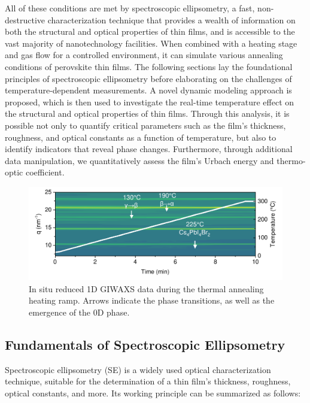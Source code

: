 All of these conditions are met by spectroscopic ellipsometry, a fast, non-destructive characterization technique that provides a wealth of information on both the structural and optical properties of thin films, and is accessible to the vast majority of nanotechnology facilities. When combined with a heating stage and gas flow for a controlled environment, it can simulate various annealing conditions of perovskite thin films. The following sections lay the foundational principles of spectroscopic ellipsometry before elaborating on the challenges of temperature-dependent measurements. A novel dynamic modeling approach is proposed, which is then used to investigate the real-time temperature effect on the structural and optical properties of  thin films. Through this analysis, it is possible not only to quantify critical parameters such as the film's thickness, roughness, and optical constants as a function of temperature, but also to identify indicators that reveal phase changes. Furthermore, through additional data manipulation, we quantitatively assess the film's Urbach energy and thermo-optic coefficient.


\begin{figure}
  \centering
  \medskip
  \includegraphics[width=\textwidth]{chapters/material_properties/images/GIWAXS_In_Situ.pdf}
  \caption[Short caption for Table of Figures]{In situ reduced 1D GIWAXS data during the thermal annealing heating ramp. Arrows indicate the phase transitions, as well as the emergence of the 0D  phase.} 
  
  \label{fig:ch2:giwaxs_insitu}
\end{figure}



\subsection{Fundamentals of Spectroscopic Ellipsometry} \label{ch:ellipsometry:intro}


Spectroscopic ellipsometry (SE) is a widely used optical characterization technique, suitable for the determination of a thin film's thickness, roughness, optical constants, and more. Its working principle can be summarized as follows: 

